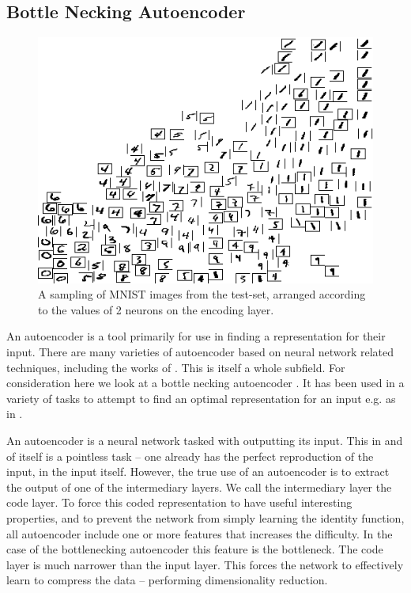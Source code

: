 \documentclass[12pt,parskip]{komatufte}
\begin{document}
\subsection{Bottle Necking Autoencoder}\label{sec:bottle-necking-autoencoder}
\begin{figure}
	\caption{A sampling of MNIST images from the test-set, arranged according to the values of 2 neurons on the encoding layer.}
	\label{mnist-encoding}
	\includegraphics[width=\textwidth]{figs/chapterintromachinelearning/mnist-encoding.png}
\end{figure}
An autoencoder is a tool primarily for use in finding a representation for their input.
There are many varieties of autoencoder based on neural network related techniques, including the works of \textcite{hinton2002RBM,hinton2006reducing,hinton2006fastDBN,vincent2010stacked,ICML2012Chen_416,2014VAE}.
This is itself a whole subfield.
For consideration here we look at a bottle necking autoencoder
\parencite{bourlard1988auto,japkowicz2000nonlinear}.
It has been used in a variety of tasks to attempt to find an optimal representation for an input e.g. as in .

An autoencoder is a neural network tasked with outputting its input.
This in and of itself is a pointless task -- one already has the perfect reproduction of the input, in the input itself.
However, the true use of an autoencoder is to extract the output of one of the intermediary layers.
We call the intermediary layer the code layer.
To force this coded representation to have useful interesting properties,
and to prevent the network from simply learning the identity function,
all autoencoder include one or more features that increases the difficulty.
In the case of the bottlenecking autoencoder this feature is the bottleneck.
The code layer is much narrower than the input layer.
This forces the network to effectively learn to compress the data -- performing dimensionality reduction.
\end{document}
